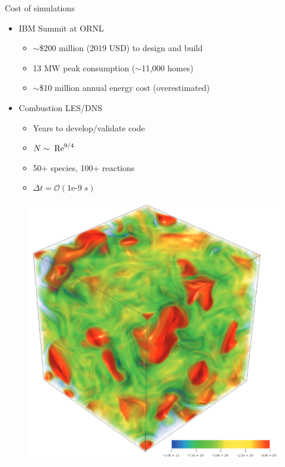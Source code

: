 \documentclass[]{beamer}
\begin{document}
\begin{frame}{Cost of simulations}
    \begin{itemize}
        \item IBM Summit at ORNL
        \begin{itemize}
            \item $\sim$\$200 million (2019 USD) to design and build
            \item 13 MW peak consumption ($\sim$11,000 homes)
            \item $\sim$\$10 million annual energy cost (overestimated)
        \end{itemize}
        \item Combustion LES/DNS
        \begin{itemize}
			\item Years to develop/validate code
            \item $N \sim \; \text{Re}^{9/4}$
            \item 50+ species, 100+ reactions
            \item $\Delta t = \mathcal{O}(1\text{e-}9 \; s)$
        \end{itemize}
    \end{itemize}
	\centering
	\begin{minipage}{0.3\linewidth}
		\centering
		\begin{figure}
			\centering
			\includegraphics[width=0.87\linewidth]{intro/combustionDNS.png}

\end{figure}
\end{minipage}
\end{frame}
\end{document}
